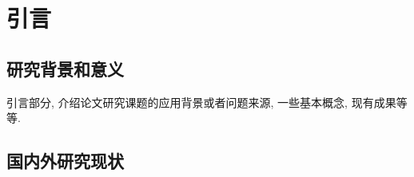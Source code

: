\documentclass[UTF8,openright]{ctexbook}
\begin{document}

\let\cleardoublepage\clearpage

\setcounter{tocdepth}{2} %



\tableofcontents

\newpage%
\pagestyle{fancy}




























\mainmatter
\linespread{1.6}\selectfont %
\pagestyle{fancy}
\fancyfoot[RO,RE]{}
\fancyfoot[LO,LE]{} %
\fancyfoot[RO,LE]{{\thepage}}%

\chapter{引言}
\section{研究背景和意义}


引言部分\cite{bi:hw-ml-challenges}, 介绍论文研究课题的应用背景或者问题来源,\cite{bi:hw-sw-co-design}
一些基本概念, 现有成果等等.


\section{国内外研究现状}
\end{document}

